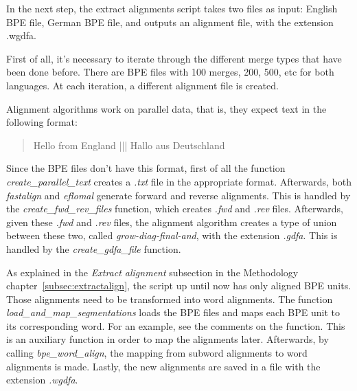 In the next step, the extract alignments script takes two files as input: English BPE file, German BPE file, and outputs an alignment file, with the extension .wgdfa.

First of all, it's necessary to iterate through the different merge types that have been done before. There are BPE files with 100 merges, 200, 500, etc for both languages. At each iteration, a different alignment file is created.

Alignment algorithms work on parallel data, that is, they expect text in the following format:

\begin{quote}
  Hello from England ||| Hallo aus Deutschland
\end{quote}

Since the BPE files don't have this format, first of all the function \emph{create\_parallel\_text} creates a \emph{.txt} file in the appropriate format. Afterwards, both \emph{fastalign} and \emph{eflomal} generate forward and reverse alignments. This is handled by the \emph{create\_fwd\_rev\_files} function, which creates \emph{.fwd} and \emph{.rev} files. Afterwards, given these \emph{.fwd} and \emph{.rev} files, the alignment algorithm creates a type of union between these two, called \emph{grow-diag-final-and}, with the extension \emph{.gdfa}. This is handled by the \emph{create\_gdfa\_file} function.

As explained in the \textit{Extract alignment} subsection in the Methodology chapter~\ref{subsec:extractalign}, the script up until now has only aligned BPE units. Those alignments need to be transformed into word alignments. The function \emph{load\_and\_map\_segmentations} loads the BPE files and maps each BPE unit to its corresponding word. For an example, see the comments on the function. This is an auxiliary function in order to map the alignments later. Afterwards, by calling \emph{bpe\_word\_align}, the mapping from subword alignments to word alignments is made. Lastly, the new alignments are saved in a file with the extension \emph{.wgdfa}.

